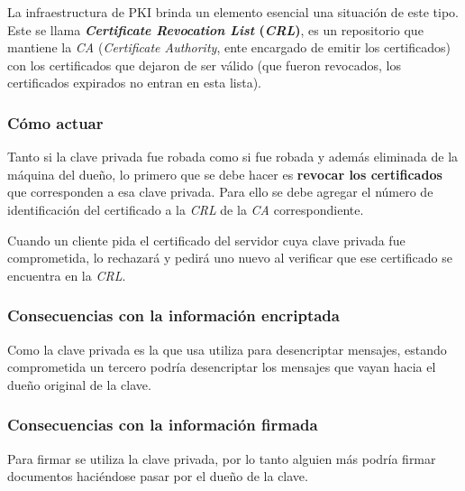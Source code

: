 La infraestructura de PKI brinda un elemento esencial una situación de este tipo. Este se llama \textbf{\emph{Certificate Revocation List} (\emph{CRL})}, es un repositorio que mantiene la \emph{CA} (\emph{Certificate Authority}, ente encargado de emitir los certificados) con los certificados que dejaron de ser válido (que fueron revocados, los certificados expirados no entran en esta lista). 

\subsubsection{Cómo actuar}

Tanto si la clave privada fue robada como si fue robada y además eliminada de la máquina del dueño, lo primero que se debe hacer es \textbf{revocar los certificados} que corresponden a esa clave privada. Para ello se debe agregar el número de identificación del certificado a la \emph{CRL} de la \emph{CA} correspondiente.  

Cuando un cliente pida el certificado del servidor cuya clave privada fue comprometida, lo rechazará y pedirá uno nuevo al verificar que ese certificado se encuentra en la \emph{CRL}. 

\subsubsection{Consecuencias con la información encriptada}

Como la clave privada es la que usa utiliza para desencriptar mensajes, estando comprometida un tercero podría desencriptar los mensajes que vayan hacia el dueño original de la clave.

\subsubsection{Consecuencias con la información firmada}

Para firmar se utiliza la clave privada, por lo tanto alguien más podría firmar documentos haciéndose pasar por el dueño de la clave.














\clearpage
\printbibliography


